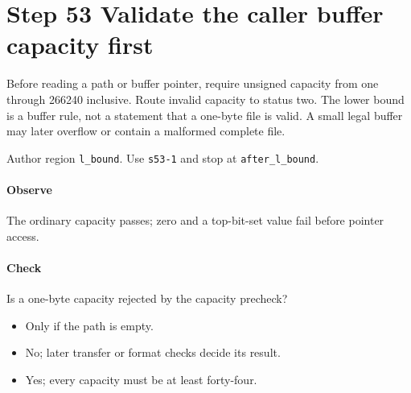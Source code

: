 \section{Step 53 Validate the caller buffer capacity first}\label{pcm-wav-s53}
Before reading a path or buffer pointer, require unsigned capacity from one through 266240 inclusive. Route invalid capacity to status two. The lower bound is a buffer rule, not a statement that a one-byte file is valid. A small legal buffer may later overflow or contain a malformed complete file.

Author region \texttt{l\_bound}. Use \texttt{s53-1} and stop at \texttt{after\_l\_bound}.

\paragraph{Observe} The ordinary capacity passes; zero and a top-bit-set value fail before pointer access.

\paragraph{Check} Is a one-byte capacity rejected by the capacity precheck?
\begin{itemize}
\item[A.] Only if the path is empty.
\item[B.] No; later transfer or format checks decide its result.
\item[C.] Yes; every capacity must be at least forty-four.
\end{itemize}
